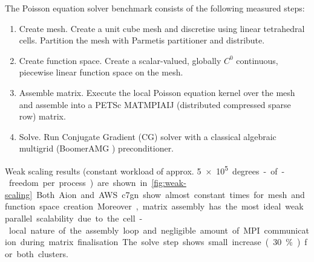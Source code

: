 The Poisson equation solver benchmark consists of the following measured steps:
\begin{enumerate}
    \item Create mesh. Create a unit cube mesh and discretise using linear
    tetrahedral cells. Partition the mesh with Parmetis partitioner and
    distribute.
    \item Create function space. Create a scalar-valued, globally $C^0$
    continuous, piecewise linear function space on the mesh.
    \item Assemble matrix. Execute the local Poisson equation kernel over the
    mesh and assemble into a PETSc MATMPIAIJ (distributed compressed sparse row)
    matrix.
    \item Solve. Run Conjugate Gradient (CG) solver with a classical algebraic
    multigrid (BoomerAMG \citep{hypre}) preconditioner.
\end{enumerate}
%
Weak scaling results (constant workload of approx. \SI{5e+5} degrees-of-freedom
per process) are shown in \autoref{fig:weak-scaling}. Both Aion and AWS c7gn
show almost constant times for mesh and function space creation. Moreover,
matrix assembly has the most ideal weak parallel scalability due to the
cell-local nature of the assembly loop and negligible amount of MPI
communication during matrix finalisation. The solve step shows small
increase (30 \%) for both clusters.

